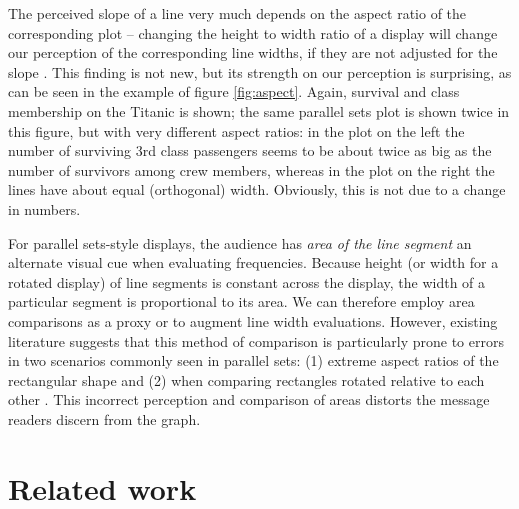 \documentclass[journal]{vgtc}\usepackage{graphicx, color}
\begin{document}
The perceived slope of a line very much depends on the aspect ratio of the corresponding plot -- changing the height to width ratio of a display  will change our perception of the corresponding line widths, if they are not adjusted for the slope \cite{cleveland:1984}. This finding is not new, but its strength on our perception is surprising, as can be seen in the example of  figure \ref{fig:aspect}.  Again, survival and class membership on the Titanic is shown; the same parallel sets plot is shown twice in this figure, but with very different aspect ratios: in the  plot on the left the number of surviving 3rd class passengers seems to be about twice as big as the number of survivors among crew members, whereas in the plot on the right the lines have about equal (orthogonal) width. Obviously, this is not due to a change in numbers.

For parallel sets-style displays, the audience has {\it area of the line segment} an alternate visual cue when evaluating frequencies. Because height (or width for a rotated display) of  line segments is constant across the display, the width of a particular  segment is proportional to its area. We can therefore employ area comparisons as a proxy or to augment line width evaluations. 
However, existing literature suggests that this method of comparison is particularly  prone to errors in two scenarios commonly seen in parallel sets: (1) extreme aspect ratios of the rectangular shape \cite{heer:2010} %
and (2) when comparing rectangles rotated relative to each other \cite{kong:2010}. 
This incorrect perception and comparison of areas distorts the message readers discern from the graph. %


\section{Related work}
\end{document}
